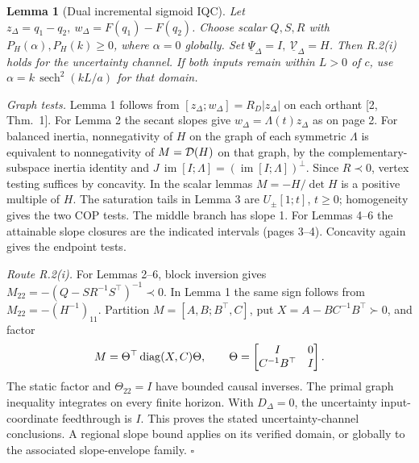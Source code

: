 \documentclass[11pt,a4paper]{article}
\newcommand{\subt}[1]{\par\smallskip{\color{ink}\large\bfseries #1}\par}
\newtheorem{lema}{Lemma}
\begin{document}
\begin{lema}[Dual incremental sigmoid IQC]
Let \(z_\Delta=q_1-q_2,\ w_\Delta=F(q_1)-F(q_2)\). Choose scalar \(Q,S,R\) with \(P_H(\alpha),P_H(k)\ge0\), where \(\alpha=0\) globally. Set \(\underline\Psi_\Delta=I,\ \underline{\mathcal V}_\Delta=H\). Then R.2(i) holds for the uncertainty channel. If both inputs remain within \(L>0\) of \(c\), use \(\alpha=k\,\operatorname{sech}^2(kL/a)\) for that domain.
\end{lema}

\subt{Proofs and factorization}
\emph{Graph tests.} Lemma 1 follows from \([z_\Delta;w_\Delta]=R_D|z_\Delta|\) on each orthant [2, Thm.~1]. For Lemma 2 the secant slopes give \(w_\Delta=\Lambda(t)z_\Delta\) as on page 2. For balanced inertia, nonnegativity of \(H\) on the graph of each symmetric \(\Lambda\) is equivalent to nonnegativity of \(M=\mathcal D(H)\) on that graph, by the complementary-subspace inertia identity and \(J\,\operatorname{im}[I;\Lambda]=(\operatorname{im}[I;\Lambda])^\perp\). Since \(R\prec0\), vertex testing suffices by concavity. In the scalar lemmas \(M=-H/\det H\) is a positive multiple of \(H\). The saturation tails in Lemma 3 are \(U_\pm[1;t]\), \(t\ge0\); homogeneity gives the two COP tests. The middle branch has slope 1. For Lemmas 4--6 the attainable slope closures are the indicated intervals (pages 3--4). Concavity again gives the endpoint tests.

\emph{Route R.2(i).} For Lemmas 2--6, block inversion gives \(M_{22}=-(Q-SR^{-1}S^\top)^{-1}\prec0\). In Lemma 1 the same sign follows from \(M_{22}=-(H^{-1})_{11}\). Partition \(M=[A,B;B^\top,C]\), put \(X=A-BC^{-1}B^\top\succ0\), and factor
\[
 M=\Theta^\top\operatorname{diag}(X,C)\Theta,\qquad
 \Theta=\begin{bmatrix}I&0\\C^{-1}B^\top&I\end{bmatrix}.
\]
The static factor and \(\Theta_{22}=I\) have bounded causal inverses. The primal graph inequality integrates on every finite horizon. With \(D_\Delta=0\), the uncertainty input-coordinate feedthrough is \(I\). This proves the stated uncertainty-channel conclusions. A regional slope bound applies on its verified domain, or globally to the associated slope-envelope family. \(\square\)
\end{document}
